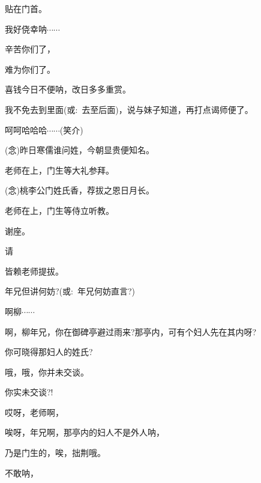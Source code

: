{{贴在门首。}\hspace{30pt}~

{我好侥幸呐$\cdots{}\cdots{}$}

{辛苦你们了，}\hspace{30pt}~

{难为你们了。}\hspace{30pt}~

{喜钱今日不便呐，改日多多重赏。}

{我不免去到里面({\akai 或}:~去至后面)，说与妹子知道，再打点谒师便了。}


{呵呵哈哈哈$\cdots{}\cdots{}$({\hwfs 笑}{\hwfs 介})}

{\vspace{5pt}}

{({\akai 念})昨日寒儒谁问姓，今朝显贵便知名。}

{老师在上，门生等大礼参拜。}

{({\akai 念})桃李公门姓氏香，荐拔之恩日月长。}

{老师在上，门生等侍立听教。}

{谢座。}\hspace{40pt}~

{请}\hspace{40pt}~

{皆赖老师提拔。}\hspace{20pt}~

{年兄但讲何妨?({\akai 或}:~年兄何妨直言?)}

{啊柳$\cdots{}\cdots{}$}

{啊，柳年兄，你在御碑亭避过雨来?那亭内，可有个妇人先在其内呀?}

{你可晓得那妇人的姓氏?}\hspace{10pt}~

{哦，哦，你并未交谈。}\hspace{10pt}~

{你实未交谈?!}\hspace{20pt}~

{哎呀，老师啊，}\hspace{20pt}~

{唉呀，年兄啊，那亭内的妇人不是外人呐，}

{乃是门生的，唉，拙荆哦。}\hspace{10pt}~

{不敢呐，}\hspace{30pt}~

}

